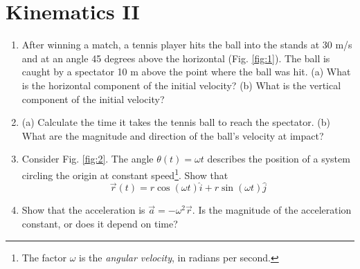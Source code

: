 \documentclass{article}
\begin{document}
\section{Kinematics II}

\begin{enumerate}
\item After winning a match, a tennis player hits the ball into the stands at 30 m/s and at an angle 45 degrees above the horizontal (Fig. \ref{fig:1}).  The ball is caught by a spectator 10 m above the point where the ball was hit. (a) What is the horizontal component of the initial velocity?  (b) What is the vertical component of the initial velocity? \\ \vspace{1cm}
\item (a) Calculate the time it takes the tennis ball to reach the spectator. (b) What are the magnitude and direction of the ball's velocity at impact? \\ \vspace{4cm}
\item Consider Fig. \ref{fig:2}.  The angle $\theta(t) = \omega t$ describes the position of a system circling the origin at constant speed\footnote{The factor $\omega$ is the \textit{angular velocity}, in radians per second.}.  Show that
\begin{equation}
\vec{r}(t) = r \cos(\omega t) \hat{i} + r \sin(\omega t) \hat{j}
\end{equation} \vspace{2cm}
\item Show that the acceleration is $\vec{a} = -\omega^2 \vec{r}$.  Is the magnitude of the acceleration constant, or does it depend on time?
\end{enumerate}
\end{document}
